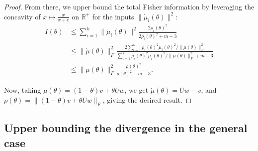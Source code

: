 \documentclass{article}
\theoremstyle{plain}
\newtheorem{theorem}{Theorem}[section]
\theoremstyle{definition}
\theoremstyle{remark}
\begin{document}
\begin{proof}
From there, we upper bound the total Fisher information by leveraging the concavity of $x \mapsto \frac{x}{x+c}$ on $\mathbb{R}^+$ for the inputs $\|\dot \mu_i(\theta)\|^2$:
\begin{align}
    I(\theta) &\leq \sum_{i=1}^k \|\dot \mu_i(\theta)\|^2 \frac{2\rho_i(\theta)^2 }{2\rho_i(\theta)^2 + m - 3}\\
    &\leq \|\dot \mu(\theta)\|_F^2 \frac{2\sum_{i=1}^k \rho_i(\theta)^2 \dot \mu_i(\theta)^2 / \|\dot \mu(\theta)\|_F^2}{\sum_{i=1}^k  \rho_i(\theta)^2 \dot \mu_i(\theta)^2 / \|\dot \mu(\theta)\|_F^2 + m - 3}\\
    &\leq \|\dot \mu(\theta)\|_F^2 \frac{\rho(\theta)^2}{\rho(\theta)^2 + m - 3}.
\end{align}


Now, taking $\mu(\theta) = (1-\theta) v + \theta Uw$, we get $\dot \mu(\theta) = Uw-v$, and $\rho(\theta) = \|(1-\theta) v + \theta Uw\|_F$, giving the desired result.

\end{proof}

\newpage
\subsection{Upper bounding the divergence in the general case}
\label{app:prop-renyi-upper-bound-multi-dim}

\end{document}
